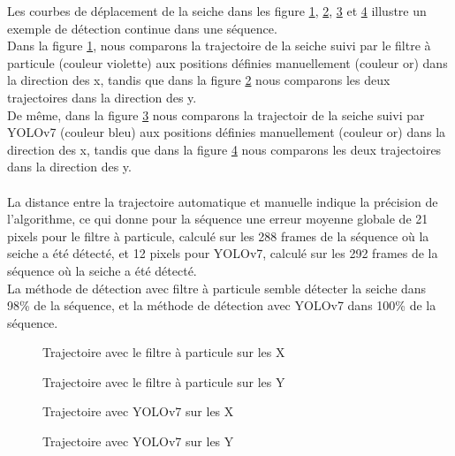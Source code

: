 Les courbes de déplacement de la seiche dans les figure \ref{fig:trajX_pf}, \ref{fig:trajY_pf}, \ref{fig:trajX_yolo} et \ref{fig:trajY_yolo} illustre un exemple de détection continue dans une séquence.\\
Dans la figure \ref{fig:trajX_pf}, nous comparons la trajectoire de la seiche suivi par le filtre à particule (couleur violette) aux positions définies manuellement (couleur or) dans la direction des x, tandis que dans la figure \ref{fig:trajY_pf} nous comparons les deux trajectoires dans la direction des y.\\
De même, dans la figure \ref{fig:trajX_yolo} nous comparons la trajectoir de la seiche suivi par YOLOv7 (couleur bleu) aux positions définies manuellement (couleur or) dans la direction des x, tandis que dans la figure \ref{fig:trajY_yolo} nous comparons les deux trajectoires dans la direction des y.\\
\\
La distance entre la trajectoire automatique et manuelle indique la précision de l'algorithme, ce qui donne pour la séquence une erreur moyenne globale de 21 pixels pour le filtre à particule, calculé sur les 288 frames de la séquence où la seiche a été détecté, et 12 pixels pour YOLOv7, calculé sur les 292 frames de la séquence où la seiche a été détecté.\\
La méthode de détection avec filtre à particule semble détecter la seiche dans 98\% de la séquence, et la méthode de détection avec YOLOv7 dans 100\% de la séquence.

\begin{figure}[!htbp]
\center
\caption{Trajectoire avec le filtre à particule sur les X}
\label{fig:trajX_pf}
\end{figure}
\FloatBarrier

\begin{figure}[!htbp]
\center
\caption{Trajectoire avec le filtre à particule sur les Y}
\label{fig:trajY_pf}
\end{figure}
\FloatBarrier

\begin{figure}[!htbp]
\center
\caption{Trajectoire avec YOLOv7 sur les X}
\label{fig:trajX_yolo}
\end{figure}
\FloatBarrier

\begin{figure}[!htbp]
\center
\caption{Trajectoire avec YOLOv7 sur les Y}
\label{fig:trajY_yolo}
\end{figure}
\FloatBarrier
 
